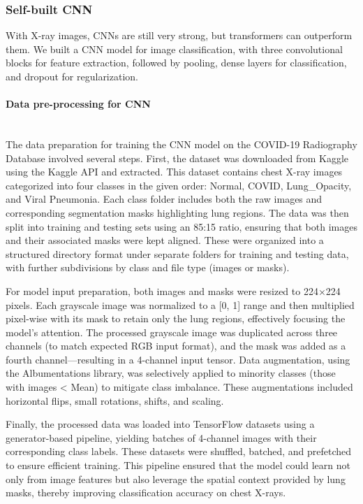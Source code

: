 \documentclass{article}
\begin{document}
\subsubsection{Self-built CNN}
With X-ray images, CNNs are still very strong, but transformers can outperform them.
We built a CNN model for image classification, with three convolutional blocks for feature extraction, followed by pooling, dense layers for classification, and dropout for regularization.

\paragraph{Data pre-processing for CNN}\mbox{}\\

The data preparation for training the CNN model on the COVID-19 Radiography Database involved several steps. First, the dataset was downloaded from Kaggle using the Kaggle API and extracted. This dataset contains chest X-ray images categorized into four classes in the given order: Normal, COVID, Lung\_Opacity, and Viral Pneumonia. Each class folder includes both the raw images and corresponding segmentation masks highlighting lung regions. The data was then split into training and testing sets using an 85:15 ratio, ensuring that both images and their associated masks were kept aligned. These were organized into a structured directory format under separate folders for training and testing data, with further subdivisions by class and file type (images or masks).

For model input preparation, both images and masks were resized to 224×224 pixels. Each grayscale image was normalized to a [0, 1] range and then multiplied pixel-wise with its mask to retain only the lung regions, effectively focusing the model’s attention. The processed grayscale image was duplicated across three channels (to match expected RGB input format), and the mask was added as a fourth channel—resulting in a 4-channel input tensor. Data augmentation, using the Albumentations library, was selectively applied to minority classes (those with images < Mean) to mitigate class imbalance. These augmentations included horizontal flips, small rotations, shifts, and scaling.

Finally, the processed data was loaded into TensorFlow datasets using a generator-based pipeline, yielding batches of 4-channel images with their corresponding class labels. These datasets were shuffled, batched, and prefetched to ensure efficient training. This pipeline ensured that the model could learn not only from image features but also leverage the spatial context provided by lung masks, thereby improving classification accuracy on chest X-rays.
\end{document}
